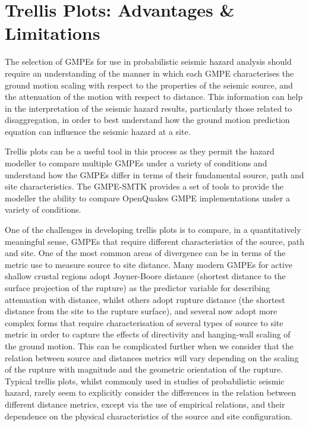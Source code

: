 \section{Trellis Plots: Advantages \& Limitations}
\label{sec:trellis}

The selection of GMPEs for use in probabilistic seismic hazard analysis should require an understanding of the manner in which each GMPE characterises the ground motion scaling with respect to the properties of the seismic source, and the attenuation of the motion with respect to distance. This information can help in the interpretation of the seismic hazard results, particularly those related to disaggregation, in order to best understand how the ground motion prediction equation can influence the seismic hazard at a site.

Trellis plots can be a useful tool in this process as they permit the hazard modeller to compare multiple GMPEs under a variety of conditions and understand how the GMPEs differ in terms of their fundamental source, path and site characteristics. The GMPE-SMTK provides a set of tools to provide the modeller the ability to compare OpenQuakes GMPE implementations under a variety of conditions.

One of the challenges in developing trellis plots is to compare, in a quantitatively meaningful sense, GMPEs that require different characteristics of the source, path and site. One of the most common areas of divergence can be in terms of the metric use to measure source to site distance. Many modern GMPEs for active shallow crustal regions adopt Joyner-Boore distance (shortest distance to the surface projection of the rupture) as the predictor variable for describing attenuation with distance, whilst others adopt rupture distance (the shortest distance from the site to the rupture surface), and several now adopt more complex forms that require characterisation of several types of source to site metric in order to capture the effects of directivity and hanging-wall scaling of the ground motion. This can be complicated further when we consider that the relation between source and distances metrics will vary depending on the scaling of the rupture with magnitude and the geometric orientation of the rupture. Typical trellis plots, whilst commonly used in studies of probabilistic seismic hazard, rarely seem to explicitly consider the differences in the relation between different distance metrics, except via the use of empirical relations, and their dependence on the physical characteristics of the source and site configuration.

